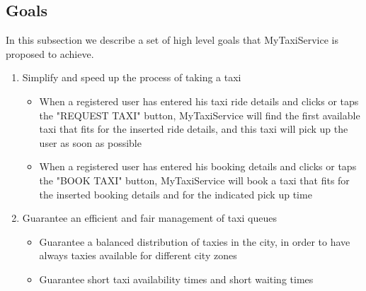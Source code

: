 \documentclass[11pt]{article} %
\begin{document}
    \subsection{Goals}
        In this subsection we describe a set of high level goals that MyTaxiService is proposed to achieve.\newline
      \begin{enumerate}
        \item Simplify and speed up the process of taking a taxi
        \begin{itemize}
          \item When a registered user has entered his taxi ride details and clicks or taps
      the "REQUEST TAXI" button, MyTaxiService will find the first
      available taxi that fits for the inserted ride details, and this taxi will
      pick up the user as soon as possible

          \item When a registered user has entered his booking details and clicks or taps
        the "BOOK TAXI" button, MyTaxiService will book a taxi that fits for the
        inserted booking details and for the indicated pick up time
        \end{itemize}
        \item Guarantee an efficient and fair management of taxi queues
        \begin{itemize}
          \item Guarantee a balanced distribution of taxies in the city, in order
      to have always taxies available for different city zones
          \item Guarantee short taxi availability times and short waiting times
         \end{itemize}
      \end{enumerate}
      
\end{document}
